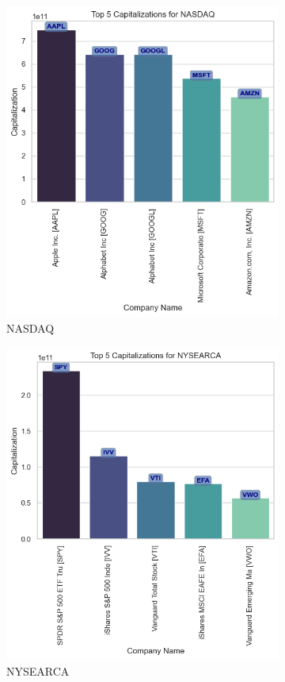 \documentclass[12pt]{article}
\begin{document}
\begin{figure}[h!]
    \begin{subfigure}{.4\textwidth}
        \centering
        \includegraphics[width=.7\textwidth]{P1.5.3.png}
        \caption{NASDAQ}
        \label{fig:1.5.3}
    \end{subfigure}%
    \begin{subfigure}{.4\textwidth}
        \centering
        \includegraphics[width=.7\textwidth]{P1.5.4.png}
        \caption{NYSEARCA}
        \label{fig:1.5.4}
    \end{subfigure}
    \begin{subfigure}{.7\textwidth}
        \centering

\end{subfigure}
\end{figure}
\end{document}
